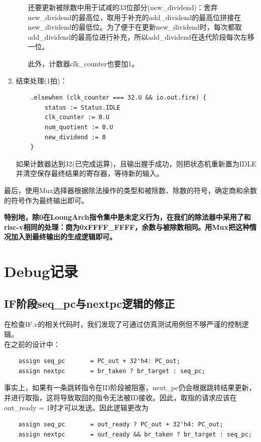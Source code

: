 \documentclass[11pt]{article}
\begin{document}
\begin{enumerate}
\begin{enumerate}
        还要更新被除数中用于试减的33位部分(new_dividend)：舍弃new_dividend的最高位，取用于补充的add_dividend的最高位拼接在new_dividend的最低位。为了便于在更新new_dividend时，每次都取add_dividend的最高位进行补充，所以add_dividend在迭代阶段每次左移一位。

        此外，计数器clk_counter也要加1。
    \end{enumerate}
    
    \item 结束处理(1拍)：
    \begin{lstlisting}
    .elsewhen (clk_counter === 32.U && io.out.fire) {
        status := Status.IDLE
        clk_counter := 0.U
        num_quotient := 0.U
        new_dividend := 0
    }
    \end{lstlisting}
    如果计数器达到32(已完成运算)，且输出握手成功，则把状态机重新置为IDLE并清空保存最终结果的寄存器，等待新的输入。

\end{enumerate}

最后，使用Mux选择器根据除法操作的类型和被除数、除数的符号，确定商和余数的符号作为最终输出即可。

\textbf{特别地，除0在LoongArch指令集中是未定义行为，在我们的除法器中采用了和risc-v相同的处理：商为0xFFFF_FFFF，余数与被除数相同。用Mux把这种情况加入到最终输出的生成逻辑即可。}


\section{Debug记录}

\subsection{IF阶段seq_pc与nextpc逻辑的修正}
    \indent 在检查IF.v的相关代码时，我们发现了可通过仿真测试用例但不够严谨的控制逻辑。\\
    \indent 在之前的设计中：
    \begin{lstlisting}
    assign seq_pc       = PC_out + 32'h4: PC_out;
    assign nextpc       = br_taken ? br_target : seq_pc;
    \end{lstlisting}

    \indent 事实上，如果有一条跳转指令在ID阶段被阻塞，next\_pc仍会根据跳转结果更新，并进行取指，这将导致取回的指令无法被ID接收。因此，取指的请求应该在out\_ready = 1时才可以发送。因此逻辑更改为
    \begin{lstlisting}
    assign seq_pc       = out_ready ? PC_out + 32'h4: PC_out;
    assign nextpc       = out_ready && br_taken ? br_target : seq_pc;
    \end{lstlisting}
\end{document}
